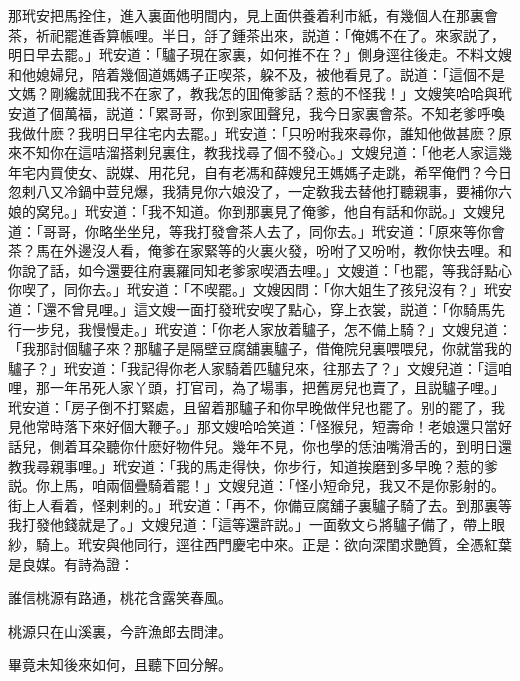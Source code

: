 那玳安把馬拴住，進入裏面他明間内，見上面供養着利市紙，有幾個人在那裏會茶，祈祀罷進香算帳哩。半日，㧱了鍾茶出來，説道：「俺媽不在了。來家説了，明日早去罷。」玳安道：「驢子現在家裏，如何推不在？」側身逕往後走。不料文嫂和他媳婦兒，陪着幾個道媽媽子正喫茶，躱不及，被他看見了。説道：「這個不是文媽？剛纔就囬我不在家了，教我怎的囬俺爹話？惹的不怪我！」文嫂笑哈哈與玳安道了個萬福，説道：「累哥哥，你到家囬聲兒，我今日家裏會茶。不知老爹呼喚我做什麽？我明日早往宅内去罷。」玳安道：「只吩咐我來尋你，誰知他做甚麽？原來不知你在這咭溜搭剌兒裏住，教我找尋了個不發心。」文嫂兒道：「他老人家這幾年宅内買使女、説媒、用花兒，自有老馮和薛嫂兒王媽媽子走跳，希罕俺們？今日忽剌八又冷鍋中荳兒爆，我猜見你六娘没了，一定敎我去替他打聽親事，要補你六娘的窝兒。」玳安道：「我不知道。你到那裏見了俺爹，他自有話和你説。」文嫂兒道：「哥哥，你略坐坐兒，等我打發會茶人去了，同你去。」玳安道：「原來等你會茶？馬在外邊沒人看，俺爹在家緊等的火裏火發，吩咐了又吩咐，教你快去哩。和你說了話，如今還要往府裏羅同知老爹家喫酒去哩。」文嫂道：「也罷，等我㧱點心你喫了，同你去。」玳安道：「不喫罷。」文嫂因問：「你大姐生了孩兒沒有？」玳安道：「還不曾見哩。」這文嫂一面打發玳安喫了點心，穿上衣裳，説道：「你騎馬先行一步兒，我慢慢走。」玳安道：「你老人家放着驢子，怎不備上騎？」文嫂兒道：「我那討個驢子來？那驢子是隔壁豆腐舖裏驢子，借俺院兒裏喂喂兒，你就當我的驢子？」玳安道：「我記得你老人家騎着匹驢兒來，往那去了？」文嫂兒道：「這咱哩，那一年吊死人家丫頭，打官司，為了場事，把舊房兒也賣了，且説驢子哩。」玳安道：「房子倒不打緊處，且留着那驢子和你早晚做伴兒也罷了。别的罷了，我見他常時落下來好個大鞭子。」那文嫂哈哈笑道：「怪猴兒，短壽命！老娘還只當好話兒，側着耳朶聽你什麽好物件兒。幾年不見，你也學的恁油嘴滑舌的，到明日還教我尋親事哩。」玳安道：「我的馬走得快，你步行，知道挨磨到多早晚？惹的爹説。你上馬，咱兩個疊騎着罷！」文嫂兒道：「怪小短命兒，我又不是你影射的。街上人看着，怪剌剌的。」玳安道：「再不，你備豆腐舖子裏驢子騎了去。到那裏等我打發他錢就是了。」文嫂兒道：「這等還許説。」一面敎文ら將驢子備了，帶上眼紗，騎上。玳安與他同行，逕往西門慶宅中來。正是：欲向深閨求艷質，全憑紅葉是良媒。有詩為證：

\begin{myquote}
誰信桃源有路通，桃花含露笑春風。

桃源只在山溪裏，今許漁郎去問津。
\end{myquote}

畢竟未知後來如何，且聽下回分解。

